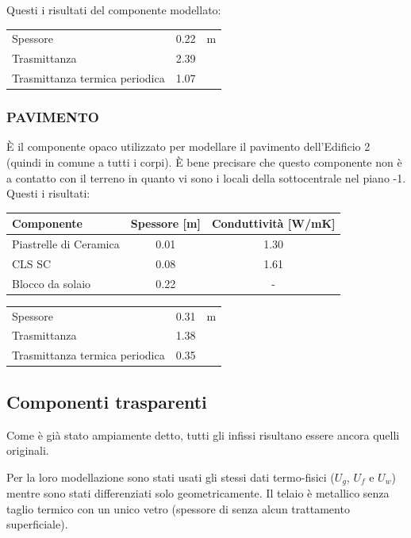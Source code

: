 Questi i risultati del componente modellato:
\begin{center}
	\begin{tabular}{lcc}
		\toprule
		Spessore & \num{0.22} & \si{m}\\
		Trasmittanza & \num{2.39} & \trasm\\
		Trasmittanza termica periodica & \num{1.07} & \trasm\\
		\bottomrule
	\end{tabular}
\end{center}
\newpage
\subsubsection{PAVIMENTO}
È il componente opaco utilizzato per modellare il pavimento dell'Edificio 2 (quindi in comune a tutti i corpi). È bene precisare che questo componente non è a contatto con il terreno in quanto vi sono i locali della sottocentrale nel piano -1.\\
Questi i risultati:
\begin{center}
	\begin{tabular}{lcc}
		\toprule
		Componente & Spessore [m] & Conduttività [\si{W/mK}] \\
		\midrule
		Piastrelle di Ceramica & \num{0.01} & \num{1.30} \\
		CLS SC & \num{0.08} & \num{1.61}\\
		Blocco da solaio & \num{0.22} & - \\
		\bottomrule
	\end{tabular}
\end{center}
\begin{center}
	\begin{tabular}{lcc}
		\toprule
		Spessore & \num{0.31} & \si{m}\\
		Trasmittanza & \num{1.38} & \trasm\\
		Trasmittanza termica periodica & \num{0.35} & \trasm\\
		\bottomrule
	\end{tabular}
\end{center}
\clearpage
\subsection{Componenti trasparenti}
Come è già stato ampiamente detto, tutti gli infissi risultano essere ancora quelli originali.

Per la loro modellazione sono stati usati gli stessi dati termo-fisici ($U_g$, $U_f$ e $U_w$) mentre sono stati differenziati solo geometricamente.
Il telaio è metallico senza taglio termico con un unico vetro (spessore di  senza alcun trattamento superficiale).

